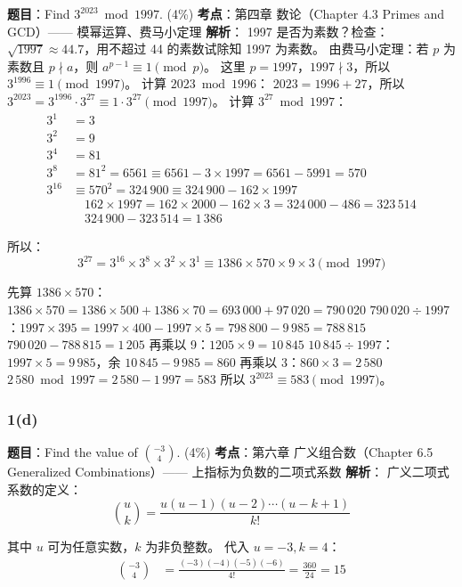 \documentclass[10pt,a4paper,openany]{ctexbook}
\theoremstyle{definition}
\theoremstyle{remark}
\begin{document}
\textbf{题目}：Find $3^{2023} \bmod 1997$. (4\%)
\textbf{考点}：第四章 数论（Chapter 4.3 Primes and GCD）—— 模幂运算、费马小定理
\textbf{解析}：
1997 是否为素数？检查：$\sqrt{1997} \approx 44.7$，用不超过 44 的素数试除知 1997 为素数。
由费马小定理：若 $p$ 为素数且 $p \nmid a$，则 $a^{p-1} \equiv 1 \pmod{p}$。
这里 $p=1997$，$1997 \nmid 3$，所以 $3^{1996} \equiv 1 \pmod{1997}$。
计算 $2023 \bmod 1996$：
$2023 = 1996 + 27$，所以 $3^{2023} = 3^{1996} \cdot 3^{27} \equiv 1 \cdot 3^{27} \pmod{1997}$。
计算 $3^{27} \bmod 1997$：
\[
\begin{aligned}
3^1 &= 3 \\
3^2 &= 9 \\
3^4 &= 81 \\
3^8 &= 81^2 = 6561 \equiv 6561 - 3 \times 1997 = 6561 - 5991 = 570 \\
3^{16} &\equiv 570^2 = 324\,900 \equiv 324\,900 - 162 \times 1997 \\
&\quad 162 \times 1997 = 162 \times 2000 - 162 \times 3 = 324\,000 - 486 = 323\,514 \\
&\quad 324\,900 - 323\,514 = 1\,386
\end{aligned}
\]

所以：
\[
3^{27} = 3^{16} \times 3^8 \times 3^2 \times 3^1 \equiv 1386 \times 570 \times 9 \times 3 \pmod{1997}
\]

先算 $1386 \times 570$：
$1386 \times 570 = 1386 \times 500 + 1386 \times 70 = 693\,000 + 97\,020 = 790\,020$
$790\,020 \div 1997$：$1997 \times 395 = 1997 \times 400 - 1997 \times 5 = 798\,800 - 9\,985 = 788\,815$
$790\,020 - 788\,815 = 1\,205$
再乘以 9：$1205 \times 9 = 10\,845$
$10\,845 \div 1997$：$1997 \times 5 = 9\,985$，余 $10\,845 - 9\,985 = 860$
再乘以 3：$860 \times 3 = 2\,580$
$2\,580 \bmod 1997 = 2\,580 - 1\,997 = 583$
所以 $3^{2023} \equiv 583 \pmod{1997}$。
\subsubsection{1(d)}

\textbf{题目}：Find the value of $\binom{-3}{4}$. (4\%)
\textbf{考点}：第六章 广义组合数（Chapter 6.5 Generalized Combinations）—— 上指标为负数的二项式系数
\textbf{解析}：
广义二项式系数的定义：
\[
\binom{u}{k} = \frac{u(u-1)(u-2)\cdots(u-k+1)}{k!}
\]

其中 $u$ 可为任意实数，$k$ 为非负整数。
代入 $u = -3, k = 4$：
\[
\begin{aligned}
\binom{-3}{4} &= \frac{(-3)(-4)(-5)(-6)}{4!} = \frac{360}{24} = 15
\end{aligned}
\]
\end{document}
